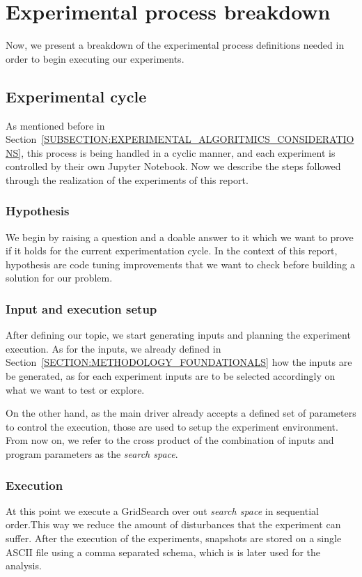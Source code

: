 \section{Experimental process breakdown}
Now, we present a breakdown of the experimental process definitions needed in order to begin executing our experiments.

\subsection{Experimental cycle}
As mentioned before in Section~\ref{SUBSECTION:EXPERIMENTAL_ALGORITMICS_CONSIDERATIONS}, this process is being handled in a cyclic manner, and each experiment is controlled by their own Jupyter Notebook. Now we describe the steps followed through the realization of the experiments of this report.

\subsubsection{Hypothesis}
We begin by raising a question and a doable answer to it which we want to prove if it holds for the current experimentation cycle. In the context of this report, hypothesis are code tuning improvements that we want to check before building a solution for our problem.

\subsubsection{Input and execution setup}
After defining our topic, we start generating inputs and planning the experiment execution. As for the inputs, we already defined in Section~\ref{SECTION:METHODOLOGY_FOUNDATIONALS} how the inputs are be generated, as for each experiment inputs are to be selected accordingly on what we want to test or explore. 

On the other hand, as the main driver already accepts a defined set of parameters to control the execution, those are used to setup the experiment environment. From now on, we refer to the cross product of the combination of inputs and program parameters as the \textit{search space}.

\subsubsection{Execution}
At this point we execute a GridSearch over out \textit{search space} in sequential order.This way we reduce the amount of disturbances that the experiment can suffer. After the execution of the experiments, snapshots are stored on a single ASCII file using a comma separated schema, which is is later used for the analysis.

